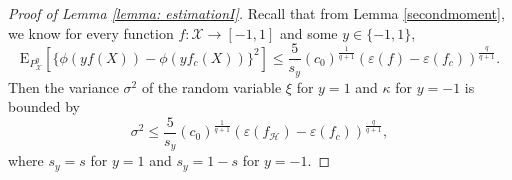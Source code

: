 \documentclass{article}
\begin{document}
\begin{proof}[Proof of Lemma \ref{lemma: estimationI}]
Recall that from Lemma \ref{secondmoment}, we know for every function $f: \mathcal{X} \rightarrow [-1,1]$ and some $y \in \{-1,1\}$,
\begin{equation*}
\mathrm{E}_{P_{\mathcal{X}}^y}\left[\{\phi(yf(X))-\phi(yf_c(X))\}^2\right] \leq \frac{5}{s_y}(c_0)^{\frac{1}{q+1}} (\varepsilon(f) - \varepsilon(f_c)) ^{\frac{q}{q+1}}.
\end{equation*}
Then the variance $\sigma^2$ of the random variable $\xi$ for $y=1$ and $\kappa$ for $y=-1$ is bounded by \begin{equation}\label{sigma2_bound}
    \sigma^2\leq  \frac{5}{s_y}(c_0)^{\frac{1}{q+1}} (\varepsilon(f_\mathcal{H}) - \varepsilon(f_c)) ^{\frac{q}{q+1}}, 
\end{equation}
where $s_y=s$ for $y=1$ and $s_y=1-s$ for $y=-1$.


\end{proof}
\end{document}
